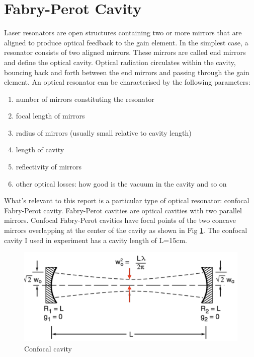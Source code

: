\documentclass[12pt,A4Paper]{article}
\begin{document}
\section{Fabry-Perot Cavity}
Laser resonators are open structures containing two or more mirrors that are aligned to produce optical feedback to the gain element. In the simplest case, a resonator consists of two aligned mirrors. These mirrors are called end mirrors and define the optical cavity. Optical radiation circulates within the cavity, bouncing back and forth between the end mirrors and passing through the gain element. An optical resonator can be characterised by the following parameters: 
\begin{enumerate}
    \item number of mirrors constituting the resonator
    \item focal length of mirrors
    \item radius of mirrors (usually small relative to cavity length)
    \item length of cavity
    \item reflectivity of mirrors
    \item other optical losses: how good is the vacuum in the cavity and so on
\end{enumerate}
What's relevant to this report is a particular type of optical resonator: confocal Fabry-Perot cavity. Fabry-Perot cavities are optical cavities with two parallel mirrors. Confocal Fabry-Perot cavities have focal points of the two concave mirrors overlapping at the center of the cavity as shown in Fig \ref{fig:confocalCavity}. The confocal cavity I used in experiment has a cavity length of L=15cm. 

\begin{figure}[H]
    \centering
    \includegraphics[width = .8\textwidth]{confocalCavity.png}
    \caption{Confocal cavity}
    \label{fig:confocalCavity}
\end{figure}
\end{document}

